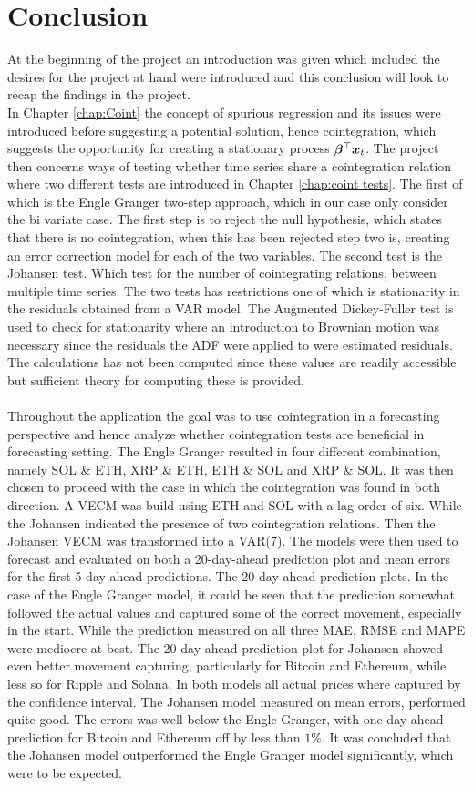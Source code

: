 \chapter{Conclusion}
At the beginning of the project an introduction was given which included the desires for the project at hand were introduced and this conclusion will look to recap the findings in the project.\\
In Chapter \ref{chap:Coint} the concept of spurious regression and its issues were introduced before suggesting a potential solution, hence cointegration, which suggests the opportunity for creating a stationary process $\boldsymbol{\beta}^\top\boldsymbol{x}_t$. The project then concerns ways of testing whether time series share a cointegration relation where two different tests are introduced in Chapter \ref{chap:coint tests}. The first of which is the Engle Granger two-step approach, which in our case only consider the bi variate case. The first step is to reject the null hypothesis, which states that there is no cointegration, when this has been rejected step two is, creating an error correction model for each of the two variables. The second test is the Johansen test. Which test for the number of cointegrating relations, between multiple time series. The two tests has restrictions one of which is stationarity in the residuals obtained from a VAR model. The Augmented Dickey-Fuller test is used to check for stationarity where an introduction to Brownian motion was necessary since the residuals the ADF were applied to were estimated residuals. The calculations has not been computed since these values are readily accessible but sufficient theory for computing these is provided. \\\\
Throughout the application the goal was to use cointegration in a forecasting perspective and hence analyze whether cointegration tests are beneficial in forecasting setting. The Engle Granger resulted in four different combination, namely SOL \& ETH, XRP \& ETH, ETH \& SOL and XRP \& SOL. It was then chosen to proceed with the case in which the cointegration was found in both direction. A VECM was build using ETH and SOL with a lag order of six. While the Johansen indicated the presence of two cointegration relations. Then the Johansen VECM was transformed into a VAR(7). The models were then used to forecast and evaluated on both a 20-day-ahead prediction plot and mean errors for the first 5-day-ahead predictions. The 20-day-ahead prediction plots. In the case of the Engle Granger model, it could be seen that the prediction somewhat followed the actual values and captured some of the correct movement, especially in the start. While the prediction measured on all three MAE, RMSE and MAPE were mediocre at best. The 20-day-ahead prediction plot for Johansen showed even better movement capturing, particularly for Bitcoin and Ethereum, while less so for Ripple and Solana. In both models all actual prices where captured by the confidence interval. The Johansen model measured on mean errors, performed quite good. The errors was well below the Engle Granger, with one-day-ahead prediction for Bitcoin and Ethereum off by less than $1\%$. It was concluded that the Johansen model outperformed the Engle Granger model significantly, which were to be expected.

